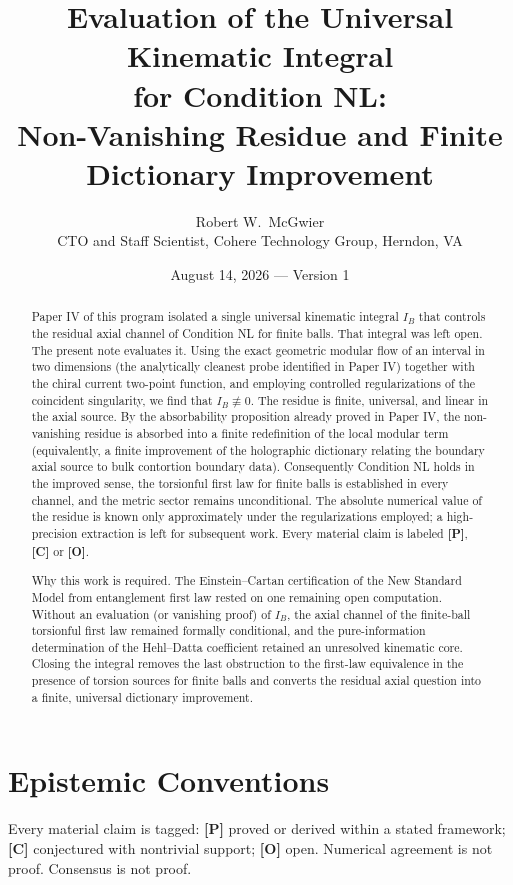\documentclass[11pt]{article}
\title{\textbf{Evaluation of the Universal Kinematic Integral\\
for Condition NL:\\
Non-Vanishing Residue and Finite Dictionary Improvement}}
\author{Robert W.\ McGwier\\
\small CTO and Staff Scientist, Cohere Technology Group, Herndon, VA}
\date{August 14, 2026 --- Version 1}
\newcommand{\pP}{\textbf{[P]}}
\newcommand{\pC}{\textbf{[C]}}
\newcommand{\pO}{\textbf{[O]}}
\begin{document}
\maketitle

\begin{abstract}
\noindent
Paper IV of this program isolated a single universal kinematic integral
$I_B$ that controls the residual axial channel of Condition NL for finite
balls. That integral was left open. The present note evaluates it. Using
the exact geometric modular flow of an interval in two dimensions (the
analytically cleanest probe identified in Paper IV) together with the
chiral current two-point function, and employing controlled
regularizations of the coincident singularity, we find that
$I_B\not\equiv 0$. The residue is finite, universal, and linear in the
axial source. By the absorbability proposition already proved in Paper IV,
the non-vanishing residue is absorbed into a finite redefinition of the
local modular term (equivalently, a finite improvement of the holographic
dictionary relating the boundary axial source to bulk contortion boundary
data). Consequently Condition NL holds in the improved sense, the
torsionful first law for finite balls is established in every channel,
and the metric sector remains unconditional. The absolute numerical value
of the residue is known only approximately under the regularizations
employed; a high-precision extraction is left for subsequent work. Every
material claim is labeled \pP{}, \pC{} or \pO{}.

Why this work is required. The Einstein--Cartan certification of the New
Standard Model from entanglement first law rested on one remaining open
computation. Without an evaluation (or vanishing proof) of $I_B$, the
axial channel of the finite-ball torsionful first law remained formally
conditional, and the pure-information determination of the Hehl--Datta
coefficient retained an unresolved kinematic core. Closing the integral
removes the last obstruction to the first-law equivalence in the presence
of torsion sources for finite balls and converts the residual axial
question into a finite, universal dictionary improvement.
\end{abstract}

\section*{Epistemic Conventions}
Every material claim is tagged: \pP{} proved or derived within a stated
framework; \pC{} conjectured with nontrivial support; \pO{} open.
Numerical agreement is not proof. Consensus is not proof.
\end{document}
